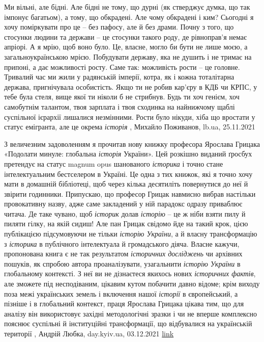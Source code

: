 Ми вільні, але бідні. Але бідні не тому, що дурні (як стверджує думка, що так
імпонує багатьом), а тому, що обкрадені. Але чому обкрадені і ким? Сьогодні я
хочу поміркувати про це – без пафосу, але й без драми.  Почну з того, що
стосунки людини та держави – це стосунки такого роду, де рівноправ’я немає
апріорі. А я мрію, щоб воно було. Це, власне, могло би бути не лише моєю, а
загальноукраїнською мрією. Побудувати державу, яка не душить і не тримає на
припоні, а дає можливості росту.  Саме так: можливість рости – це головне.
Тривалий час ми жили у радянській імперії, котра, як і кожна тоталітарна
держава, пригнічувала особистість. Якщо ти не робив кар’єру в КДБ чи КРПС, у
тебе була стеля, вище якої ти ніколи б не стрибнув.  Будь ти хоч генієм, хоч
самобутнім талантом, твоя зарплата і твоя сходинка на найнижчому щаблі
суспільної ієрархії лишалися незмінними. Рости було нікуди, хіба що вростати у
статус емігранта, але це окрема \emph{історія}
, Михайло Поживанов, lb.ua, 25.11.2021

З величезним задоволенням я прочитав нову книжку професора Ярослава Грицака
«Подолати минуле: глобальна \emph{історія} України». Цей розкішно виданий ґросбух
претендує на статус magnum opus шанованого \emph{історика} і точно стане
інтелектуальним бестселером в Україні. Це одна з тих книжок, які я точно хочу
мати в домашній бібліотеці, щоб через кілька десятиліть повернутися до неї й
звірити годинники.  Припускаю, що професор Грицак навмисно вибрав настільки
провокативну назву, адже саме закладений у ній парадокс одразу приваблює
читача. Де таке чувано, щоб \emph{історик} долав \emph{історію} – це ж ніби взяти пилу й
пиляти гілку, на якій сидиш!  Але пан Грицак свідомо йде на такий крок, цією
публікацією підсумовуючи не тільки \emph{історію України}, а й власну трансформацію з
\emph{історика} в публічного інтелектуала й громадського діяча.  Власне кажучи,
пропонована книга є не так результатом \emph{історичних досліджень} чи архівних
пошуків, як спробою автора проаналізувати, узагальнити \emph{історію України} в
глобальному контексті. З неї ви не дізнаєтеся якихось нових \emph{історичних фактів},
але зможете під несподіваним, цікавим кутом побачити давно відоме; крім виходу
поза межі українських земель і включення нашої \emph{історії} в європейський, а
пізніше і в глобальний контекст, праця Ярослава Грицака цікава тим, що для
аналізу він використовує західні методологічні зразки і чи не вперше комплексно
пояснює суспільні й інституційні трансформації, що відбувалися на українській
території
, Андрій Любка, day.kyiv.ua, 03.12.2021
\href{https://day.kyiv.ua/uk/blog/suspilstvo/yaroslav-grycak-i-dolannya-mynulogo}{link}

